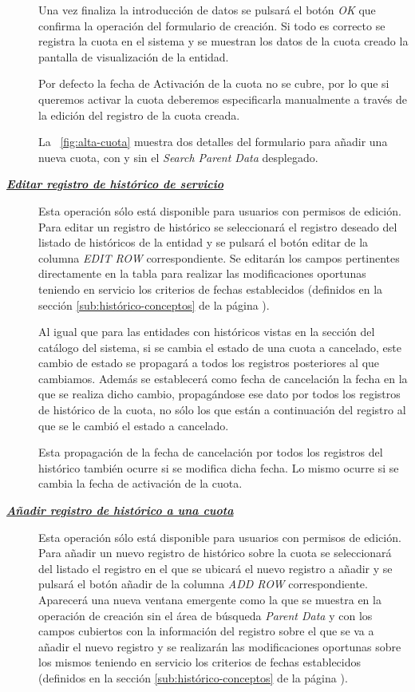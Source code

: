 \begin{description}
Una vez finaliza la introducción de datos se pulsará el botón \emph{OK} que confirma la operación del formulario de creación. Si todo es correcto se registra la cuota en el sistema y se muestran los datos de la cuota creado la pantalla de visualización de la entidad.

Por defecto la fecha de Activación de la cuota no se cubre, por lo que si queremos activar la cuota deberemos especificarla manualmente a través de la edición del registro de la cuota creada.

La \figurename~\ref{fig:alta-cuota} muestra dos detalles del formulario para añadir una nueva cuota, con y sin el \emph{Search Parent Data} desplegado.

\item[\underline{\textsl{\textbf{Editar registro de histórico de servicio}}}] Esta operación sólo está disponible para usuarios con permisos de edición.
Para editar un registro de histórico se seleccionará el registro deseado del listado de históricos de la entidad y se pulsará el botón editar de la columna \textit{EDIT ROW} correspondiente. Se editarán los campos pertinentes directamente en la tabla para realizar las modificaciones oportunas teniendo en servicio los criterios de fechas establecidos (definidos en la sección \ref{sub:histórico-conceptos} de la página \pageref{sub:histórico-conceptos}).

Al igual que para las entidades con históricos vistas en la sección del catálogo del sistema, si se cambia el estado de una cuota a cancelado, este cambio de estado se propagará a todos los registros posteriores al que cambiamos. Además se establecerá como fecha de cancelación la fecha en la que se realiza dicho cambio, propagándose ese dato por todos los registros de histórico de la cuota, no sólo los que están a continuación del registro al que se le cambió el estado a cancelado.

Esta propagación de la fecha de cancelación por todos los registros del histórico  también ocurre si se modifica dicha fecha. Lo mismo ocurre si se cambia la fecha de activación de la cuota.

\item[\underline{\textsl{\textbf{Añadir registro de histórico a una cuota}}}] Esta operación sólo está disponible para usuarios con permisos de edición.
Para añadir un nuevo registro de histórico sobre la cuota se seleccionará del listado el registro en el que se ubicará el nuevo registro a añadir y se pulsará el botón añadir de la columna \textit{ADD ROW} correspondiente. Aparecerá una nueva ventana emergente como la que se muestra en la operación de creación sin el área de búsqueda \emph{Parent Data} y con los campos cubiertos con la información del registro sobre el que se va a añadir el nuevo registro y se realizarán las modificaciones oportunas sobre los mismos teniendo en servicio los criterios de fechas establecidos (definidos en la sección \ref{sub:histórico-conceptos} de la página \pageref{sub:histórico-conceptos}).


\end{description}
